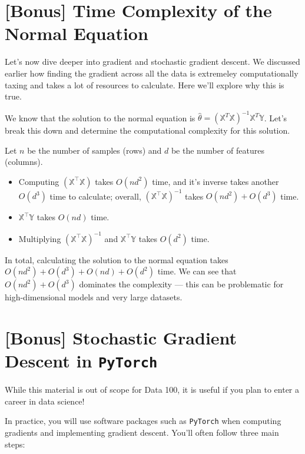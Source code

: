 \documentclass[
  letterpaper,
  DIV=11,
  numbers=noendperiod]{scrreprt}
\providecommand{\tightlist}{%
  \setlength{\itemsep}{0pt}\setlength{\parskip}{0pt}}\usepackage{longtable,booktabs,array}
\begin{document}
\section{{[}Bonus{]} Time Complexity of the Normal
Equation}\label{bonus-time-complexity-of-the-normal-equation}

Let's now dive deeper into gradient and stochastic gradient descent. We
discussed earlier how finding the gradient across all the data is
extremeley computationally taxing and takes a lot of resources to
calculate. Here we'll explore why this is true.

We know that the solution to the normal equation is
\(\hat{\theta} = (\mathbb{X}^T\mathbb{X})^{-1}\mathbb{X}^T\mathbb{Y}\).
Let's break this down and determine the computational complexity for
this solution.

Let \(n\) be the number of samples (rows) and \(d\) be the number of
features (columns).

\begin{itemize}
\tightlist
\item
  Computing \((\mathbb{X}^{\top}\mathbb{X})\) takes \(O(nd^2)\) time,
  and it's inverse takes another \(O(d^3)\) time to calculate; overall,
  \((\mathbb{X}^{\top}\mathbb{X})^{-1}\) takes \(O(nd^2) + O(d^3)\)
  time.
\item
  \(\mathbb{X}^{\top}\mathbb{Y}\) takes \(O(nd)\) time.
\item
  Multiplying \((\mathbb{X}^{\top}\mathbb{X})^{-1}\) and
  \(\mathbb{X}^{\top}\mathbb{Y}\) takes \(O(d^2)\) time.
\end{itemize}

In total, calculating the solution to the normal equation takes
\(O(nd^2) + O(d^3) + O(nd) + O(d^2)\) time. We can see that
\(O(nd^2) + O(d^3)\) dominates the complexity --- this can be
problematic for high-dimensional models and very large datasets.

\section{\texorpdfstring{{[}Bonus{]} Stochastic Gradient Descent in
\texttt{PyTorch}}{{[}Bonus{]} Stochastic Gradient Descent in PyTorch}}\label{bonus-stochastic-gradient-descent-in-pytorch}

While this material is out of scope for Data 100, it is useful if you
plan to enter a career in data science!

In practice, you will use software packages such as \texttt{PyTorch}
when computing gradients and implementing gradient descent. You'll often
follow three main steps:
\end{document}
